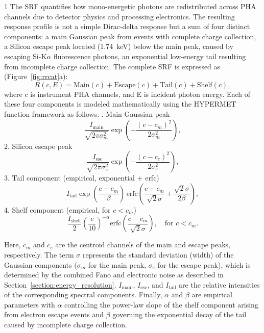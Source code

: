 \documentclass[12pt]{spieman}  %
\begin{document}
\begin{spacing}{1}
The SRF quantifies how mono-energetic photons are redistributed across PHA channels due to detector physics and processing electronics. The resulting response profile is not a simple Dirac-delta response but a sum of four distinct components:
a main Gaussian peak from events with complete charge collection,
a Silicon escape peak located (\SI{1.74}{\keV}) below the main peak, caused by escaping Si-K$\alpha$ fluorescence photons,
an exponential low-energy tail resulting from incomplete charge collection.
The complete SRF is expressed as (Figure~\ref{fig:rrcat}a):
\begin{equation}
R(c, E) = \text{Main}(c) + \text{Escape}(c) + \text{Tail}(c) + \text{Shelf}(c),
\end{equation}
where c is instrument PHA channels, and E is incident photon energy. 
Each of these four components is modeled mathematically using the HYPERMET function framework \cite{Phillips1976} as follows:
. Main Gaussian peak
\begin{equation}
\frac{I_{\text{main}}}{\sqrt{2\pi\sigma_m^2}} \exp\left( -\frac{(c - c_m)^2}{2\sigma_m^2} \right),
\end{equation}
2. Silicon escape peak 
\begin{equation}
\frac{I_{\text{esc}}}{\sqrt{2\pi\sigma_e^2}} \exp\left( -\frac{(c - c_e)^2}{2\sigma_e^2} \right),
\end{equation}
3. Tail component (empirical, exponential + erfc) 
\begin{equation}
I_{\text{tail}} \exp\left( \frac{c - c_m}{\beta} \right) \, \text{erfc}\left( \frac{c - c_m}{\sqrt{2}\sigma} + \frac{\sqrt{2}\sigma}{2\beta} \right),
\end{equation}
4. Shelf component (empirical, for $c < c_m$) 
\begin{equation}
\frac{I_{\text{shelf}}}{2} \left( \frac{c}{10} \right)^{-\alpha} \text{erfc}\left( \frac{c - c_m}{\sqrt{2}\sigma} \right), \quad \text{for } c < c_m.
\end{equation}


Here, $c_m$ and $c_e$ are the centroid channels of the main and escape peaks, respectively.
The term $\sigma$ represents the standard deviation (width) of the Gaussian components ($\sigma_m$ for the main peak, $\sigma_e$ for the escape peak), which is determined by the combined Fano and electronic noise as described in Section~\ref{section:energy_resolution}. 
$I_{\text{main}}$, $I_{\text{esc}}$, and $I_{\text{tail}}$ are the relative intensities of the corresponding spectral components.
Finally, $\alpha$ and $\beta$ are empirical parameters with $\alpha$ controlling the power-law slope of the shelf component arising from electron escape events and $\beta$ governing the exponential decay of the tail caused by incomplete charge collection.




\end{spacing}
\end{document}
